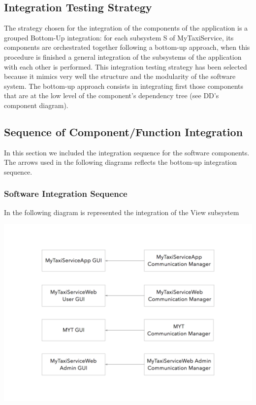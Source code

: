 \documentclass[11pt,titlepage]{article} %
\begin{document}
\subsection{Integration Testing Strategy}
  The strategy chosen for the integration of the components of the application is a grouped Bottom-Up integration: 
  for each subsystem S of MyTaxiService, its components are orchestrated together following a bottom-up approach, 
  when this procedure is finished a general integration of the subsystems of the application with each other is performed.\newline
  This integration testing strategy has been selected because it mimics very well the structure and the modularity of the software system.
  The bottom-up approach consists in integrating first those components that are at the low level of the component's dependency tree
  (see DD's component diagram).
  
\subsection{Sequence of Component/Function Integration} 
  In this section we included the integration sequence for the software components.\newline
  The arrows used in the following diagrams reflects the bottom-up integration sequence.\newline
  
  \subsubsection{Software Integration Sequence}
    In the following diagram is represented the integration of the View subsystem\newline
    \begin{center}
      \includegraphics[scale=0.25]{Integration-1.png}
    \end{center}
    
\end{document}
